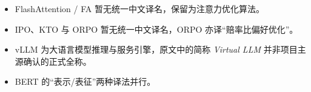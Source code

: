 \documentclass[11pt,a4paper,openany]{book}
\begin{document}
{\footnotesize
\begin{itemize}
\setlength{\itemsep}{0pt}
\setlength{\parskip}{0pt}
\item[\textsuperscript{1}] FlashAttention / FA 暂无统一中文译名，保留为注意力优化算法。
\item[\textsuperscript{2}] IPO、KTO 与 ORPO 暂无统一中文译名，ORPO 亦译“赔率比偏好优化”。
\item[\textsuperscript{3}] vLLM 为大语言模型推理与服务引擎，原文中的简称 \emph{Virtual LLM} 并非项目主源确认的正式全称。
\item[\textsuperscript{4}] BERT 的“表示/表征”两种译法并行。
\end{itemize}}










\end{document}
